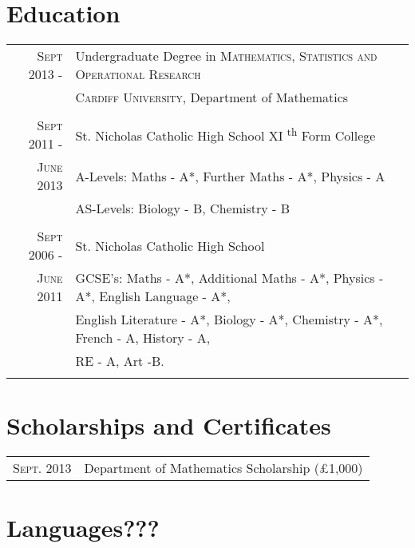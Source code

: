 \documentclass[a4paper, 11pt]{article}
\begin{document}
{\begin{tabular}{r|p{11cm}}
\end{tabular}
\section{Education}
\begin{tabular}{rl}

\textsc{Sept} 2013 - & Undergraduate Degree in \textsc{Mathematics, Statistics and Operational Research} \\
&\normalsize \textsc{Cardiff University}, Department of Mathematics\\
\\
\textsc{Sept} 2011 - & St. Nicholas Catholic High School XI \textsuperscript{th} Form College\\
\textsc{June} 2013 & A-Levels: Maths - A*, Further Maths - A*, Physics - A\\
& AS-Levels: Biology - B, Chemistry - B\\
\\
\textsc{Sept} 2006 - & St. Nicholas Catholic High School\\
\textsc{June} 2011 & GCSE's: Maths - A*, Additional Maths - A*, Physics - A*, English Language - A*,\\
& English Literature - A*, Biology - A*, Chemistry - A*, French - A, History - A,\\
& RE - A, Art -B.\\
\\

\end{tabular}
\section{Scholarships and Certificates}
\begin{tabular}{rl}

\textsc{Sept.} 2013 & Department of Mathematics Scholarship (\pounds1,000)\\

\end{tabular}
\section{Languages???}
\begin{tabular}{rl}


\end{tabular}}
\end{document}
